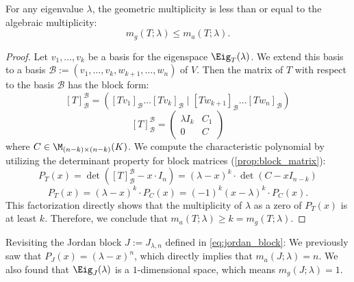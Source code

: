 \begin{proposition}
  \label{prop:mult_inequality}
  For any eigenvalue $\lambda$, the geometric multiplicity is less than or equal to the algebraic multiplicity:
  \[ m_g(T; \lambda) \le m_a(T; \lambda). \]
\end{proposition}

\begin{proof}
  Let $v_1, \dots, v_k$ be a basis for the eigenspace $\Eig_T(\lambda)$. We extend this basis to a basis $\mathcal{B} := (v_1, \dots, v_k, w_{k+1}, \dots, w_n)$ of $V$.
  Then the matrix of $T$ with respect to the basis $\mathcal{B}$ has the block form:
  \[ [T]_{\mathcal{B}}^{\mathcal{B}} = \left( [Tv_1]_{\mathcal{B}} \dots [Tv_k]_{\mathcal{B}} \mid [Tw_{k+1}]_{\mathcal{B}} \dots [Tw_n]_{\mathcal{B}} \right) \]
  \begin{equation} \label{eq:block_matrix_T}
    [T]_{\mathcal{B}}^{\mathcal{B}} = \left(\begin{array}{c|c} \lambda I_k & C_1 \\ \hline 0 & C \end{array}\right)
  \end{equation}
  where $C \in \M_{(n-k) \times (n-k)}(K)$.
  We compute the characteristic polynomial by utilizing the determinant property for block matrices (\cref{prop:block_matrix}):
  \[ P_T(x) = \det([T]_{\mathcal{B}}^{\mathcal{B}} - x \cdot I_n) = (\lambda - x)^k \cdot \det(C - x I_{n-k}) \]
  \[ P_T(x) = (\lambda - x)^k \cdot P_C(x) = (-1)^k(x - \lambda)^k \cdot P_C(x). \]
  This factorization directly shows that the multiplicity of $\lambda$ as a zero of $P_T(x)$ is at least $k$.
  Therefore, we conclude that $m_a(T;\lambda) \ge k = m_g(T;\lambda)$.
\end{proof}

\begin{example}\label{ex:jordan_block_geom_alg}
  Revisiting the Jordan block $J := J_{\lambda, n}$ defined in \eqref{eq:jordan_block}:
  We previously saw that $P_J(x) = (\lambda - x)^n$, which directly implies that $m_a(J;\lambda) = n$.
  We also found that $\Eig_J(\lambda)$ is a $1$-dimensional space, which means $m_g(J;\lambda) = 1$.
\end{example}

